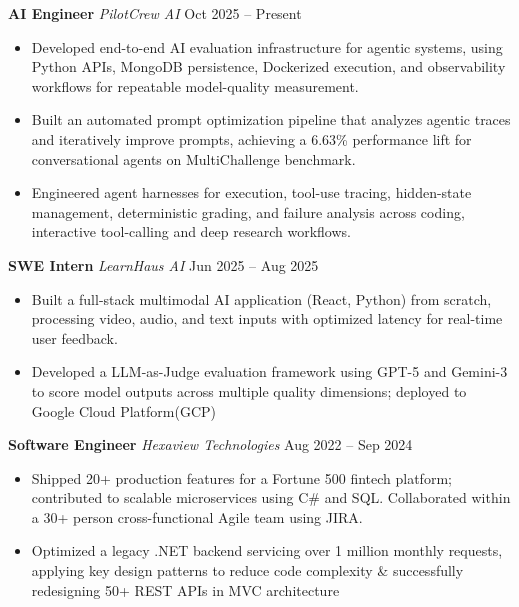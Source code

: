 \documentclass[11pt]{article}
\begin{document}
\noindent\textbf{AI Engineer} \textit{PilotCrew AI} \hfill Oct 2025 -- Present
\vspace{-6pt}
\begin{itemize}[leftmargin=0.45in, topsep=2pt, itemsep=-5pt]
\item Developed end-to-end AI evaluation infrastructure for agentic systems, using Python APIs, MongoDB persistence, Dockerized execution, and observability workflows for repeatable model-quality measurement.
\item Built an automated prompt optimization pipeline that analyzes agentic traces and iteratively improve prompts, achieving a 6.63\% performance lift for conversational agents on MultiChallenge benchmark.
\item Engineered agent harnesses for execution, tool-use tracing, hidden-state management, deterministic grading, and failure analysis across coding, interactive tool-calling and deep research workflows.
\end{itemize}
\vspace{-3pt}

\noindent\textbf{SWE Intern} \textit{LearnHaus AI} \hfill Jun 2025 -- Aug 2025
\vspace{-6pt}
\begin{itemize}[leftmargin=0.45in, topsep=2pt, itemsep=-5pt]
\item Built a full-stack multimodal AI application (React, Python) from scratch, processing video, audio, and text inputs with optimized latency for real-time user feedback.
\item Developed a LLM-as-Judge evaluation framework using GPT-5 and Gemini-3 to score model outputs across multiple quality dimensions; deployed to Google Cloud Platform(GCP)
\end{itemize}
\vspace{-6pt}
\noindent\textbf{Software Engineer} \textit{Hexaview Technologies} \hfill Aug 2022 -- Sep 2024
\vspace{-6pt}
\begin{itemize}[leftmargin=0.45in, topsep=2pt, itemsep=-5pt]
\item Shipped 20+ production features for a Fortune 500 fintech platform; contributed to scalable microservices using  C\# and SQL. Collaborated within a 30+ person cross-functional Agile team using JIRA.
\item Optimized a legacy .NET backend servicing over 1 million monthly requests, applying key
design patterns to reduce code complexity \& successfully redesigning 50+ REST APIs in MVC architecture
\end{itemize}
\end{document}
